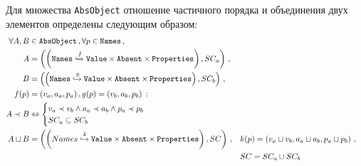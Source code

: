 Для множества \texttt{AbsObject} отношение частичного порядка и
объединения двух элементов определены следующим образом:
\begin{align*}
  \forall A, B &\in \texttt{AbsObject}\,, \forall p \in \texttt{Names}\,,\\
  A &=  \left( \left( \mathtt{Names} \xhookrightarrow{f} \mathtt{Value} \times \mathtt{Absent} \times \mathtt{Properties} \right) , SC_a \right)\,, \\
  B &=  \left( \left( \mathtt{Names} \xhookrightarrow{g} \mathtt{Value} \times \mathtt{Absent} \times \mathtt{Properties} \right) , SC_b \right)\,, \\
  f(p) &= (v_a, a_a, p_a) \,, g(p) = (v_b, a_b, p_b) \,: \\
  A \prec B &\Leftrightarrow 
 \begin{cases}
   v_a \prec v_b \land a_a \prec a_b \land p_a \prec p_b\\
   SC_a \subseteq SC_b \\
 \end{cases} \\ 
 A \sqcup B &= \left( \left( Names \xhookrightarrow{k} \mathtt{Value}
 \times \mathtt{Absent} \times \mathtt{Properties} \right), SC
 \right)\,, &&
 k(p) = \left(v_a \sqcup v_b , a_a \sqcup a_b, p_a \sqcup p_b \right)\,, \\
 & &&SC = SC_a \cup SC_b
\end{align*}%

